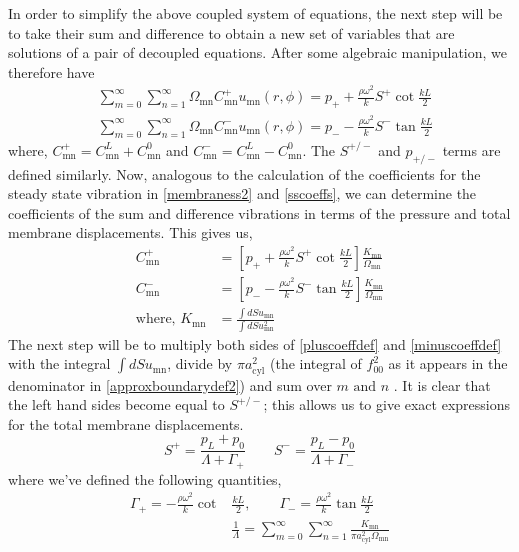 In order to simplify the above coupled system of equations, the next step will be to take their sum and difference to obtain a new set of 
variables that are solutions of a pair of decoupled equations. After some algebraic manipulation, we therefore have
\begin{align}
 &\displaystyle\sum^\infty_{m=0}\displaystyle\sum^\infty_{n=1}\Omega_{\mathrm{mn}}C^{+}_{\mathrm{mn}}u_{\mathrm{mn}}(r,\phi)=p_{+}+\frac{\rho\omega^2}{k}S^+\cot \frac{kL}{2}\\
 &\displaystyle\sum^\infty_{m=0}\displaystyle\sum^\infty_{n=1}\Omega_{\mathrm{mn}}C^{-}_{\mathrm{mn}}u_{\mathrm{mn}}(r,\phi)=p_{-}-\frac{\rho\omega^2}{k}S^-\tan \frac{kL}{2}
\end{align}
where, $C_{\mathrm{mn}}^+=C_{\mathrm{mn}}^L+C_{\mathrm{mn}}^0$ and $C_{\mathrm{mn}}^-=C_{\mathrm{mn}}^L-C_{\mathrm{mn}}^0$. The $S^{+/-}$ and $p_{+/-}$ terms are defined similarly.
Now, analogous to the calculation of the coefficients for the steady state vibration in \eqref{membraness2} and \eqref{sscoeffs}, we can determine
the coefficients of the sum and difference vibrations in terms of the pressure and total membrane displacements. This gives us,
\begin{align}
 C^{+}_{\mathrm{mn}}&=\left[p_{+}+\frac{\rho\omega^2}{k}S^+\cot \frac{kL}{2}\right]\frac{K_{\mathrm{mn}}}{\Omega_{\mathrm{mn}}}\label{pluscoeffdef}\\
 C^{-}_{\mathrm{mn}}&=\left[p_{-}-\frac{\rho\omega^2}{k}S^-\tan \frac{kL}{2}\right]\frac{K_{\mathrm{mn}}}{\Omega_{\mathrm{mn}}}\label{minuscoeffdef}\\
 \mbox{where, }K_{\mathrm{mn}}&=\frac{\int dS u_{\mathrm{mn}}}{\int dS u^2_{\mathrm{mn}}}\label{Kmndef}
\end{align}
The next step will be to multiply both sides of \eqref{pluscoeffdef} and \eqref{minuscoeffdef} with the integral $\int dS u_{\mathrm{mn}}$, 
divide by $\pi a^2_{\mathrm{cyl}}$ (the integral of $f^2_{00}$ as it appears in the denominator in \eqref{approxboundarydef2}) and
sum over $m\mbox{ and }n$ . It is clear that the left hand sides become equal to $S^{+/-}$; this allows us to give exact expressions
for the total membrane displacements.
\begin{equation}
 S^{+}=\frac{p_L+p_0}{\Lambda+\Gamma_+}\qquad S^{-}=\frac{p_L-p_0}{\Lambda+\Gamma_-}
\end{equation}
where we've defined the following quantities,
\begin{align}
 \Gamma_+ = -\frac{\rho\omega^2}{k}\cot &\frac{kL}{2},\qquad \Gamma_-= \frac{\rho\omega^2}{k}\tan \frac{kL}{2}\label{gamfirstdef}\\
&\frac{1}{\Lambda}=\displaystyle\sum^\infty_{m=0}\displaystyle\sum^\infty_{n=1}\frac{K_{\mathrm{mn}}}{\pi a^2_{\mathrm{cyl}}\Omega_{\mathrm{mn}}}\label{lamfirstdef}
\end{align}
